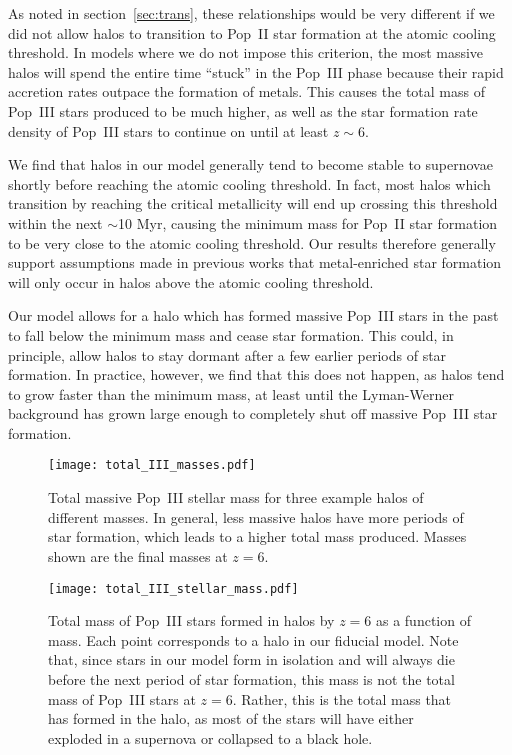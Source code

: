\documentclass[a4paper,fleqn,usenatbib]{mnras}
\begin{document}
As noted in section~\ref{sec:trans}, these relationships would be very different if we did not allow halos to transition to Pop~II star formation at the atomic cooling threshold. In models where we do not 
impose this criterion, the most massive halos will spend the entire time ``stuck'' in the Pop~III phase
because their rapid accretion rates outpace the formation of metals. This causes the total mass of Pop~III stars produced to be much higher, as well as the star formation rate density of Pop~III stars to continue on until at least $z \sim 6$.

We find that halos in our model generally tend to become stable to supernovae shortly before reaching the atomic cooling threshold. In fact, most halos which transition by reaching the critical metallicity will end up crossing this threshold within the next $\sim$10 Myr, causing the minimum mass for Pop~II star formation to be very close to the atomic cooling threshold. Our results therefore generally support assumptions made in previous works that metal-enriched star formation will only occur in halos above the atomic cooling threshold.

Our model allows for a halo which has formed massive Pop~III stars in the past to fall below the minimum mass and cease star formation. This could, in principle, allow halos to stay dormant after a few earlier periods of star formation. In practice, however, we find that this does not happen, as halos tend to grow faster than the minimum mass, at least until the Lyman-Werner background has grown large enough to completely shut off massive Pop~III star formation.

\begin{figure}
	\texttt{[image: total\_III\_masses.pdf]}
    \caption{Total massive Pop~III stellar mass for three example halos of different masses. In general, less massive halos have more periods of star formation, which leads to a higher total mass produced. Masses shown are the final masses at $z=6$.}
    \label{fig:mass_tracks}
\end{figure}

\begin{figure}
	\texttt{[image: total\_III\_stellar\_mass.pdf]}
    \caption{Total mass of 
     Pop~III stars formed in halos by $z=6$ as a function of mass. Each point corresponds to a halo in our fiducial model. Note that, since stars in our model form in isolation and will always die before the next period of star formation, this mass is not the total mass of Pop~III stars at $z=6$. Rather, this is the total mass that has formed in the halo, as most of the stars will 
     have either exploded in a supernova or collapsed to a black hole.}
    \label{fig:total_III_mass}
\end{figure}
\end{document}
